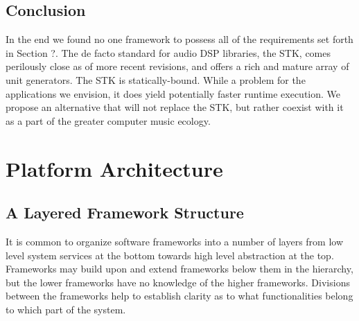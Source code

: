 \documentclass[twoside,10pt]{article}
\begin{document}


\subsection{Conclusion} %

In the end we found no one framework to possess all of the requirements set forth in Section ?.  The de facto standard for audio DSP libraries, the STK, comes perilously close as of more recent revisions\cite{Scavone:2005}, and offers a rich and mature array of unit generators.  The STK is statically-bound.  While a problem for the applications we envision, it does yield potentially faster runtime execution.  We propose an alternative that will not replace the STK, but rather coexist with it as a part of the greater computer music ecology.

%
%






\section{Platform Architecture} %

\subsection{A Layered Framework Structure}

It is common to organize software frameworks into a number of layers from low level system services at the bottom towards high level abstraction at the top.  Frameworks may build upon and extend frameworks below them in the hierarchy, but the lower frameworks have no knowledge of the higher frameworks. Divisions between the frameworks help to establish clarity as to what functionalities belong to which part of the system. 
\end{document}
